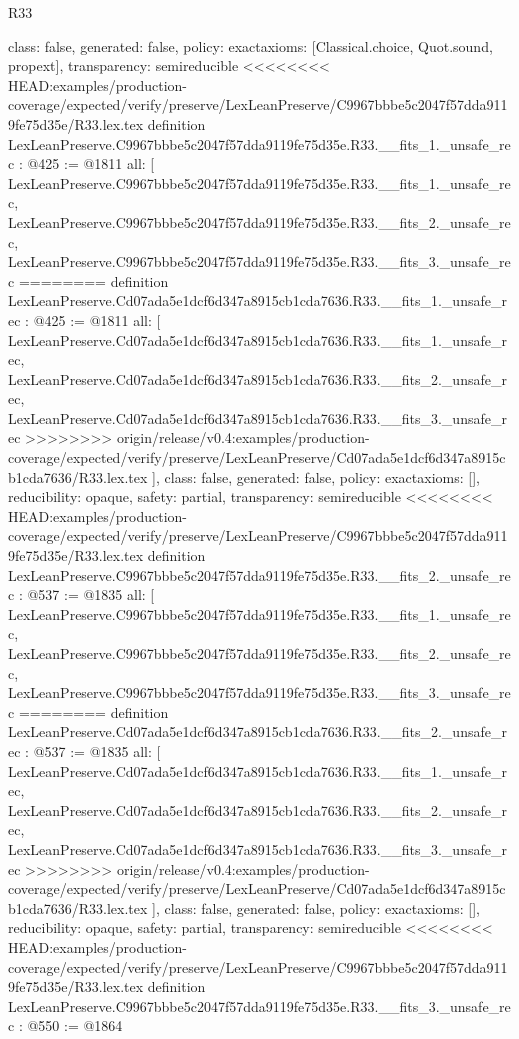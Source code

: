 \begin{lexlean}{R33}
\begin{coremodule}
{{{{{{{{{{{{{{{  class: false,
  generated: false,
  policy: exact{axioms: [Classical.choice, Quot.sound, propext]},
  transparency: semireducible
}
<<<<<<<< HEAD:examples/production-coverage/expected/verify/preserve/LexLeanPreserve/C9967bbbe5c2047f57dda9119fe75d35e/R33.lex.tex
definition LexLeanPreserve.C9967bbbe5c2047f57dda9119fe75d35e.R33.__fits_1._unsafe_rec : @425 := @1811 {
  all: [
    LexLeanPreserve.C9967bbbe5c2047f57dda9119fe75d35e.R33.__fits_1._unsafe_rec,
    LexLeanPreserve.C9967bbbe5c2047f57dda9119fe75d35e.R33.__fits_2._unsafe_rec,
    LexLeanPreserve.C9967bbbe5c2047f57dda9119fe75d35e.R33.__fits_3._unsafe_rec
========
definition LexLeanPreserve.Cd07ada5e1dcf6d347a8915cb1cda7636.R33.__fits_1._unsafe_rec : @425 := @1811 {
  all: [
    LexLeanPreserve.Cd07ada5e1dcf6d347a8915cb1cda7636.R33.__fits_1._unsafe_rec,
    LexLeanPreserve.Cd07ada5e1dcf6d347a8915cb1cda7636.R33.__fits_2._unsafe_rec,
    LexLeanPreserve.Cd07ada5e1dcf6d347a8915cb1cda7636.R33.__fits_3._unsafe_rec
>>>>>>>> origin/release/v0.4:examples/production-coverage/expected/verify/preserve/LexLeanPreserve/Cd07ada5e1dcf6d347a8915cb1cda7636/R33.lex.tex
  ],
  class: false,
  generated: false,
  policy: exact{axioms: []},
  reducibility: opaque{},
  safety: partial,
  transparency: semireducible
}
<<<<<<<< HEAD:examples/production-coverage/expected/verify/preserve/LexLeanPreserve/C9967bbbe5c2047f57dda9119fe75d35e/R33.lex.tex
definition LexLeanPreserve.C9967bbbe5c2047f57dda9119fe75d35e.R33.__fits_2._unsafe_rec : @537 := @1835 {
  all: [
    LexLeanPreserve.C9967bbbe5c2047f57dda9119fe75d35e.R33.__fits_1._unsafe_rec,
    LexLeanPreserve.C9967bbbe5c2047f57dda9119fe75d35e.R33.__fits_2._unsafe_rec,
    LexLeanPreserve.C9967bbbe5c2047f57dda9119fe75d35e.R33.__fits_3._unsafe_rec
========
definition LexLeanPreserve.Cd07ada5e1dcf6d347a8915cb1cda7636.R33.__fits_2._unsafe_rec : @537 := @1835 {
  all: [
    LexLeanPreserve.Cd07ada5e1dcf6d347a8915cb1cda7636.R33.__fits_1._unsafe_rec,
    LexLeanPreserve.Cd07ada5e1dcf6d347a8915cb1cda7636.R33.__fits_2._unsafe_rec,
    LexLeanPreserve.Cd07ada5e1dcf6d347a8915cb1cda7636.R33.__fits_3._unsafe_rec
>>>>>>>> origin/release/v0.4:examples/production-coverage/expected/verify/preserve/LexLeanPreserve/Cd07ada5e1dcf6d347a8915cb1cda7636/R33.lex.tex
  ],
  class: false,
  generated: false,
  policy: exact{axioms: []},
  reducibility: opaque{},
  safety: partial,
  transparency: semireducible
}
<<<<<<<< HEAD:examples/production-coverage/expected/verify/preserve/LexLeanPreserve/C9967bbbe5c2047f57dda9119fe75d35e/R33.lex.tex
definition LexLeanPreserve.C9967bbbe5c2047f57dda9119fe75d35e.R33.__fits_3._unsafe_rec : @550 := @1864 {
}}}}}}}}}}}}}}}}}
\end{coremodule}
\end{lexlean}
